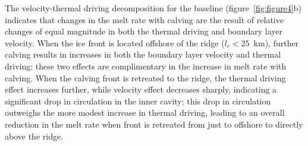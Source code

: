 \documentclass[draft]{agujournal2019}
\begin{document}
The velocity-thermal driving decomposition for the baseline (figure~\ref{fig:figure4}b) indicates that changes in the melt rate with calving are the result of relative changes of equal magnitude in both the thermal driving and boundary layer velocity. When the ice front is located offshore of the ridge ($l_c < 25$~km), further calving results in increases in both the boundary layer velocity and thermal driving: these two effects are complimentary in the increase in melt rate with calving. When the calving front is retreated to the ridge, the thermal driving effect increases further, while velocity effect decreases sharply, indicating a significant drop in circulation in the inner cavity; this drop in circulation outweighs the more modest increase in thermal driving, leading to an overall reduction in the melt rate when front is retreated from just to offshore to directly above the ridge. 
\end{document}
